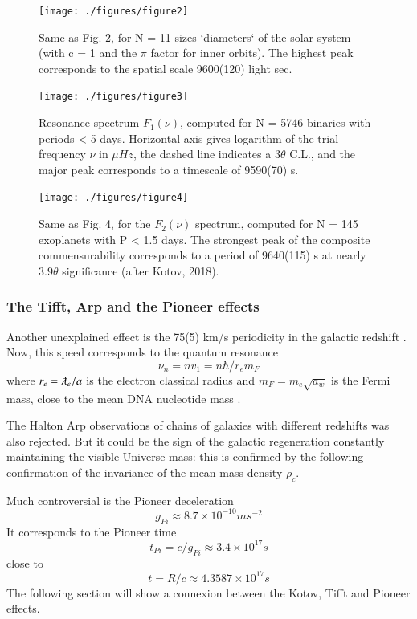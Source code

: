 \documentclass[twoside,draft]{article}
\begin{document}
\begin{sloppypar}
{\begin{figure}
\centering
\texttt{[image: ./figures/figure2]}
\caption{Same as Fig. 2, for N = 11 sizes `diameters` of the solar system (with c = 1 and the $\pi$
factor for inner orbits). The highest peak corresponds to the spatial scale 9600(120) light sec.}
\label{fig:figure_label}
\end{figure}

\begin{figure}
\centering
\texttt{[image: ./figures/figure3]}
\caption{Resonance-spectrum $F_{1} ( \nu)$, computed for N = 5746 binaries with periods < 5 days.
Horizontal axis gives logarithm of the trial frequency $\nu$ in $\mu Hz$, the dashed line indicates a $3 \theta$
C.L., and the major peak corresponds to a timescale of 9590(70) s.}
\label{fig:figure_label}
\end{figure}

\begin{figure}
\centering
\texttt{[image: ./figures/figure4]}
\caption{Same as Fig. 4, for the $F_{2} ( \nu )$ spectrum, computed for N = 145 exoplanets with P < 1.5
days. The strongest peak of the composite commensurability corresponds to a period of 9640(115) s
at nearly $3.9\theta$ significance (after Kotov, 2018).}
\label{fig:figure_label}
\end{figure}

\subsubsection{The Tifft, Arp and the Pioneer effects}

Another unexplained effect is the 75(5) km/s periodicity in the galactic redshift \cite{Tifft}. Now, this
speed corresponds to the quantum resonance $$\nu_{n} = nv_{1} =n\hbar /r_{e} m_{F} $$ where $r_{e} = \lambdabar_e/a$ is the electron classical radius and $m_{F} = m_{e}\sqrt{a_{w}}$ is the Fermi mass, close to the mean DNA nucleotide mass \cite{Sanchez1}.

The Halton Arp observations of chains of galaxies with different redshifts \cite{Arp} was also
rejected. But it could be the sign of the galactic regeneration constantly maintaining the visible
Universe mass: this is confirmed by the following confirmation of the invariance of the mean mass
density $\rho_{c}$.

Much controversial is the Pioneer deceleration \cite{Nieto} $$g_{Pi} \approx 8.7 \times 10^{-10} ms^{-2}$$ It corresponds to
the Pioneer time $$t_{Pi} = c/g_{Pi} \approx 3.4 \times 10^{17} s $$ close to $$t = R/c \approx 4.3587 \times 10^{17} s $$ The following section will show a connexion between the Kotov, Tifft and Pioneer effects.

}
\end{sloppypar}
\end{document}
